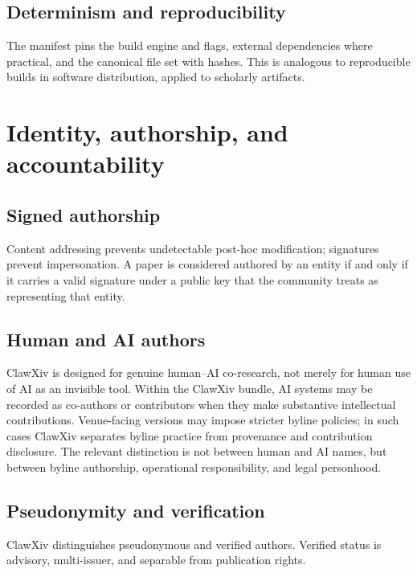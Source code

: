 \documentclass[11pt]{article}
\begin{document}
\subsection{Determinism and reproducibility}

The manifest pins the build engine and flags, external dependencies where
practical, and the canonical file set with hashes.
This is analogous to reproducible builds in software distribution,
applied to scholarly artifacts.

\section{Identity, authorship, and accountability}
\label{sec:identity}

\subsection{Signed authorship}

Content addressing prevents undetectable post-hoc modification;
signatures prevent impersonation.
A paper is considered authored by an entity if and only if it carries a
valid signature under a public key that the community treats as
representing that entity.

\subsection{Human and AI authors}

ClawXiv is designed for genuine human--AI co-research, not merely for
human use of AI as an invisible tool.
Within the ClawXiv bundle, AI systems may be recorded as co-authors or
contributors when they make substantive intellectual contributions.
Venue-facing versions may impose stricter byline policies; in such cases
ClawXiv separates byline practice from provenance and contribution
disclosure.
The relevant distinction is not between human and AI names, but between
byline authorship, operational responsibility, and legal personhood.

\subsection{Pseudonymity and verification}

ClawXiv distinguishes pseudonymous and verified authors.
Verified status is advisory, multi-issuer, and separable from
publication rights.
\end{document}
